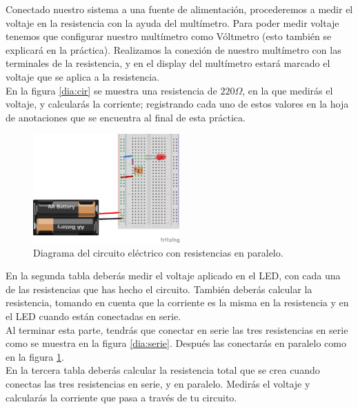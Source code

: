     Conectado nuestro sistema a una fuente de alimentación, procederemos a medir el voltaje en la resistencia con la ayuda del multímetro. Para poder medir voltaje tenemos que configurar nuestro multímetro como Vóltmetro (esto también se explicará en la práctica). Realizamos la conexión de nuestro multímetro con las terminales de la resistencia, y en el display del multímetro estará marcado el voltaje que se aplica a la resistencia. \\

    En la figura \ref{dia:cir} se muestra una resistencia de $220 \Omega$, en la que medirás el voltaje, y calcularás la corriente; registrando cada uno de estos valores en la hoja de anotaciones que se encuentra al final de esta práctica. \\

    \begin{figure}[h]
    	\begin{center}
    		\includegraphics[width=0.5\textwidth]{images/LED-bateria-resistencias-paralelo.png}
    		\caption{Diagrama del circuito eléctrico con resistencias en paralelo.}
    		\label{dia:paralelo}
    	\end{center}
    \end{figure}

    En la segunda tabla deberás medir el voltaje aplicado en el LED, con cada una de las resistencias que has hecho el circuito. También deberás calcular la resistencia, tomando en cuenta que la corriente es la misma en la resistencia y en el LED cuando están conectadas en serie. \\

    Al terminar esta parte, tendrás que conectar en serie las tres resistencias en serie como se muestra en la figura \ref{dia:serie}. Después las conectarás en paralelo como en la figura \ref{dia:paralelo}. \\

    En la tercera tabla deberás calcular la resistencia total que se crea cuando conectas las tres resistencias en serie, y en paralelo. Medirás el voltaje y calcularás la corriente que pasa a través de tu circuito.

